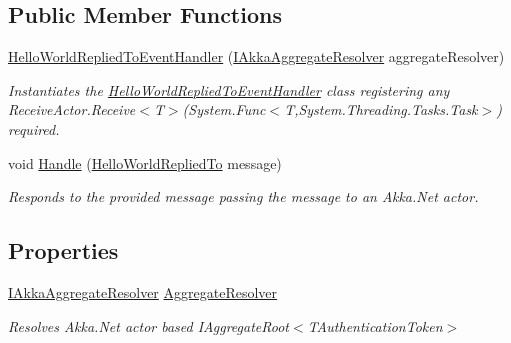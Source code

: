 \subsection*{Public Member Functions}
\begin{DoxyCompactItemize}
\item 
\hyperlink{classCqrs_1_1Akka_1_1Tests_1_1Unit_1_1Events_1_1Handlers_1_1HelloWorldRepliedToEventHandler_aa566f26a38bc21ed270a1854de47408d_aa566f26a38bc21ed270a1854de47408d}{Hello\+World\+Replied\+To\+Event\+Handler} (\hyperlink{interfaceCqrs_1_1Akka_1_1Domain_1_1IAkkaAggregateResolver}{I\+Akka\+Aggregate\+Resolver} aggregate\+Resolver)
\begin{DoxyCompactList}\small\item\em Instantiates the \hyperlink{classCqrs_1_1Akka_1_1Tests_1_1Unit_1_1Events_1_1Handlers_1_1HelloWorldRepliedToEventHandler}{Hello\+World\+Replied\+To\+Event\+Handler} class registering any Receive\+Actor.\+Receive$<$\+T$>$(\+System.\+Func$<$\+T,\+System.\+Threading.\+Tasks.\+Task$>$) required. \end{DoxyCompactList}\item 
void \hyperlink{classCqrs_1_1Akka_1_1Tests_1_1Unit_1_1Events_1_1Handlers_1_1HelloWorldRepliedToEventHandler_a12509fd1219657eca78496775641f481_a12509fd1219657eca78496775641f481}{Handle} (\hyperlink{classCqrs_1_1Akka_1_1Tests_1_1Unit_1_1Events_1_1HelloWorldRepliedTo}{Hello\+World\+Replied\+To} message)
\begin{DoxyCompactList}\small\item\em Responds to the provided {\itshape message}  passing the {\itshape message}  to an Akka.\+Net actor. \end{DoxyCompactList}\end{DoxyCompactItemize}
\subsection*{Properties}
\begin{DoxyCompactItemize}
\item 
\hyperlink{interfaceCqrs_1_1Akka_1_1Domain_1_1IAkkaAggregateResolver}{I\+Akka\+Aggregate\+Resolver} \hyperlink{classCqrs_1_1Akka_1_1Tests_1_1Unit_1_1Events_1_1Handlers_1_1HelloWorldRepliedToEventHandler_aead9e7b0edae372414fffea474407514_aead9e7b0edae372414fffea474407514}{Aggregate\+Resolver}
\begin{DoxyCompactList}\small\item\em Resolves Akka.\+Net actor based I\+Aggregate\+Root$<$\+T\+Authentication\+Token$>$ \end{DoxyCompactList}\end{DoxyCompactItemize}


